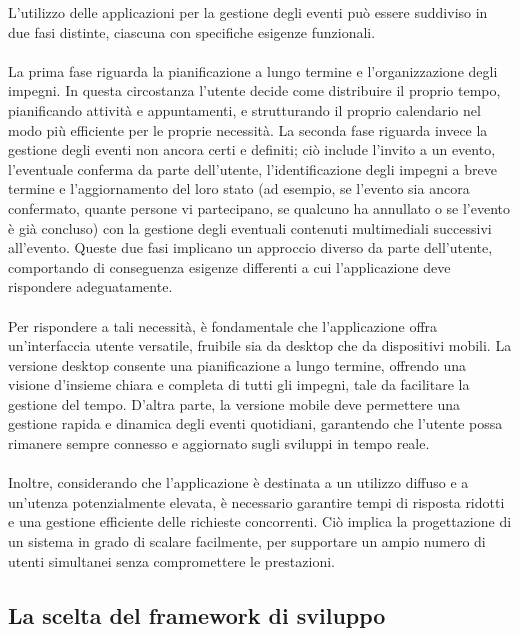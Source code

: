 L’utilizzo delle applicazioni per la gestione degli eventi può essere suddiviso in due fasi distinte,
ciascuna con specifiche esigenze funzionali.\\
\\
La prima fase riguarda la pianificazione a lungo termine e l’organizzazione degli impegni.
In questa circostanza l’utente decide come distribuire il proprio tempo, pianificando attività e appuntamenti,
e strutturando il proprio calendario nel modo più efficiente per le proprie necessità.
La seconda fase riguarda invece la gestione degli eventi non ancora certi e definiti;
ciò include l’invito a un evento, l’eventuale conferma da parte dell’utente,
l’identificazione degli impegni a breve termine e l’aggiornamento del loro stato
(ad esempio, se l’evento sia ancora confermato, quante persone vi partecipano,
se qualcuno ha annullato o se l'evento è già concluso)
con la gestione degli eventuali contenuti multimediali successivi all’evento.
Queste due fasi implicano un approccio diverso da parte dell’utente,
comportando di conseguenza esigenze differenti a cui l’applicazione deve rispondere adeguatamente.\\
\\
Per rispondere a tali necessità, è fondamentale che l'applicazione offra un'interfaccia utente versatile,
fruibile sia da desktop che da dispositivi mobili.
La versione desktop consente una pianificazione a lungo termine,
offrendo una visione d'insieme chiara e completa di tutti gli impegni,
tale da facilitare la gestione del tempo.
D'altra parte, la versione mobile deve permettere una gestione rapida e dinamica degli eventi quotidiani,
garantendo che l'utente possa rimanere sempre connesso e aggiornato sugli sviluppi in tempo reale.\\
\\
Inoltre, considerando che l'applicazione è destinata a un utilizzo diffuso e a un'utenza potenzialmente elevata,
è necessario garantire tempi di risposta ridotti e una gestione efficiente delle richieste concorrenti.
Ciò implica la progettazione di un sistema in grado di scalare facilmente,
per supportare un ampio numero di utenti simultanei senza compromettere le prestazioni.\\

\subsection{La scelta del framework di sviluppo}

